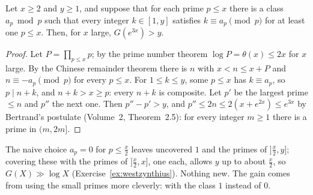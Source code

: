 \begin{lemma}\label{lem:covering}
Let $x\ge2$ and $y\ge1$, and suppose that for each prime $p\le x$ there is a class $a_p\bmod p$ such that every integer $k\in[1,y]$ satisfies $k\equiv a_p\pmod p$ for at least one $p\le x$. Then, for $x$ large, $G(e^{3x})>y$.
\end{lemma}
\begin{proof}
Let $P=\prod_{p\le x}p$; by the prime number theorem $\log P=\theta(x)\le2x$ for $x$ large. By the Chinese remainder theorem there is $n$ with $x<n\le x+P$ and $n\equiv-a_p\pmod p$ for every $p\le x$. For $1\le k\le y$, some $p\le x$ has $k\equiv a_p$, so $p\mid n+k$, and $n+k>x\ge p$: every $n+k$ is composite. Let $p'$ be the largest prime $\le n$ and $p''$ the next one. Then $p''-p'>y$, and $p''\le2n\le2(x+e^{2x})\le e^{3x}$ by Bertrand's postulate (Volume~2, Theorem~2.5): for every integer $m\ge1$ there is a prime in $(m,2m]$.
\end{proof}

The naive choice $a_p=0$ for $p\le\frac x2$ leaves uncovered $1$ and the primes of $]\frac x2,y]$; covering these with the primes of $]\frac x2,x]$, one each, allows $y$ up to about $\frac x2$, so $G(X)\gg\log X$ (Exercise~\ref{ex:westzynthius}). Nothing new. The gain comes from using the small primes more cleverly: with the class $1$ instead of $0$.

